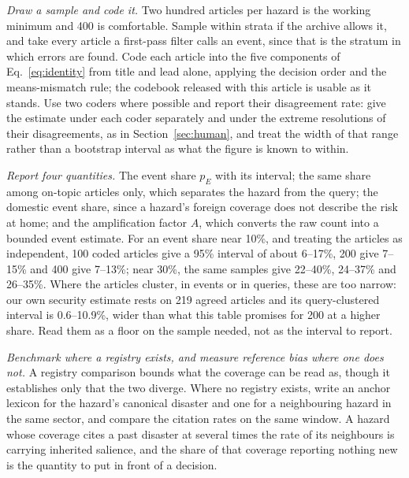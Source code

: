 \documentclass[1p,times]{elsarticle}
\begin{document}
\emph{Draw a sample and code it.} Two hundred articles per hazard is the working minimum and 400 is comfortable. Sample within strata if the archive allows it, and take every article a first-pass filter calls an event, since that is the stratum in which errors are found. Code each article into the five components of Eq.~\eqref{eq:identity} from title and lead alone, applying the decision order and the means-mismatch rule; the codebook released with this article is usable as it stands. Use two coders where possible and report their disagreement rate: give the estimate under each coder separately and under the extreme resolutions of their disagreements, as in Section~\ref{sec:human}, and treat the width of that range rather than a bootstrap interval as what the figure is known to within.

\emph{Report four quantities.} The event share $p_E$ with its interval; the same share among on-topic articles only, which separates the hazard from the query; the domestic event share, since a hazard's foreign coverage does not describe the risk at home; and the amplification factor $A$, which converts the raw count into a bounded event estimate. For an event share near 10\%, and treating the articles as independent, 100 coded articles give a 95\% interval of about 6--17\%, 200 give 7--15\% and 400 give 7--13\%; near 30\%, the same samples give 22--40\%, 24--37\% and 26--35\%. Where the articles cluster, in events or in queries, these are too narrow: our own security estimate rests on 219 agreed articles and its query-clustered interval is 0.6--10.9\%, wider than what this table promises for 200 at a higher share. Read them as a floor on the sample needed, not as the interval to report.

\emph{Benchmark where a registry exists, and measure reference bias where one does not.} A registry comparison bounds what the coverage can be read as, though it establishes only that the two diverge. Where no registry exists, write an anchor lexicon for the hazard's canonical disaster and one for a neighbouring hazard in the same sector, and compare the citation rates on the same window. A hazard whose coverage cites a past disaster at several times the rate of its neighbours is carrying inherited salience, and the share of that coverage reporting nothing new is the quantity to put in front of a decision.
\end{document}
